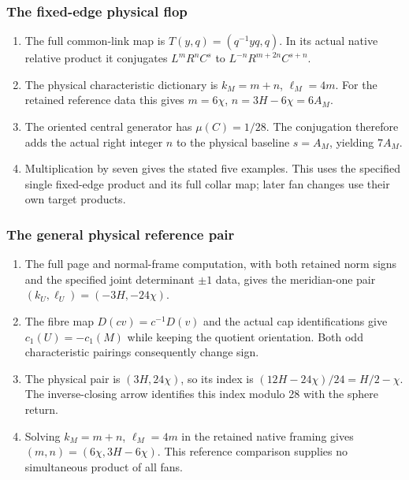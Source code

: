 \subsubsection{The fixed-edge physical flop}
\RungOne
\begin{enumerate}[label=\arabic*.]
\item The full common-link map is $T(y,q)=(q^{-1}yq,q)$.
  In its actual native relative product it conjugates
  $L^mR^nC^s$ to $L^{-n}R^{m+2n}C^{s+n}$.
\item The physical characteristic dictionary is
  $k_M=m+n$, $\ell_M=4m$. For the retained reference data
  this gives $m=6\chi$, $n=3H-6\chi=6A_M$.
\item The oriented central generator has $\mu(C)=1/28$.
  The conjugation therefore adds the actual right integer
  $n$ to the physical baseline $s=A_M$, yielding $7A_M$.
\item Multiplication by seven gives the stated five examples.
  This uses the specified single fixed-edge product and
  its full collar map; later fan changes use their own
  target products.
\end{enumerate}

\subsubsection{The general physical reference pair}
\RungOne
\begin{enumerate}[label=\arabic*.]
\item The full page and normal-frame computation, with both
  retained norm signs and the specified joint determinant
  $\pm1$ data, gives the meridian-one pair
  $(k_U,\ell_U)=(-3H,-24\chi)$.
\item The fibre map $D(cv)=c^{-1}D(v)$ and the actual cap
  identifications give $c_1(U)=-c_1(M)$ while keeping the
  quotient orientation. Both odd characteristic pairings
  consequently change sign.
\item The physical pair is $(3H,24\chi)$, so its index is
  $(12H-24\chi)/24=H/2-\chi$. The inverse-closing arrow
  identifies this index modulo 28 with the sphere return.
\item Solving $k_M=m+n$, $\ell_M=4m$ in the retained native
  framing gives $(m,n)=(6\chi,3H-6\chi)$. This reference
  comparison supplies no simultaneous product of all fans.
\end{enumerate}

